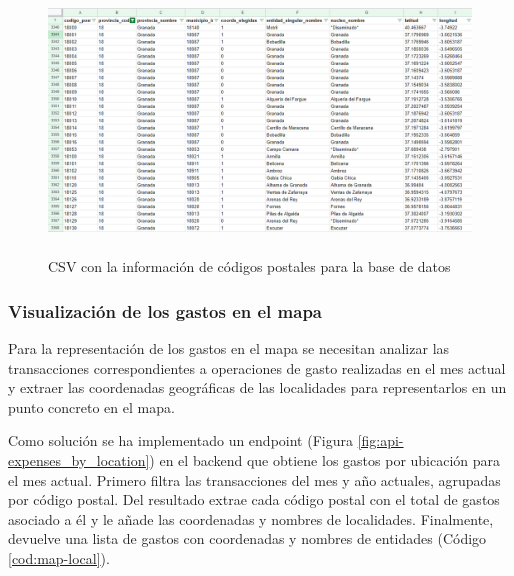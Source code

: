 \begin{figure}[ht!]
    \centering
    \includegraphics[height=70mm]{imagenes/municipios_cp.png}
    \caption{CSV con la información de códigos postales para la base de datos}
    \label{fig:CSV_municipios}
\end{figure}


\subsubsection{Visualización de los gastos en el mapa}
Para la representación de los gastos en el mapa se necesitan analizar las transacciones correspondientes a operaciones de gasto realizadas en el mes actual y extraer las coordenadas geográficas de las localidades para representarlos en un punto concreto en el mapa. 

Como solución se ha implementado un endpoint (Figura \ref{fig:api-expenses_by_location}) en el backend que obtiene los gastos por ubicación para el mes actual. Primero filtra las transacciones del mes y año actuales, agrupadas por código postal. Del resultado extrae cada código postal con el total de gastos asociado a él y le añade las coordenadas y nombres de localidades. Finalmente, devuelve una lista de gastos con coordenadas y nombres de entidades (Código \ref{cod:map-local}).


